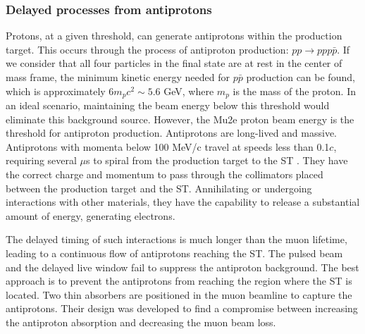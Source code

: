 \subsubsection{Delayed processes from antiprotons}
Protons, at a given threshold, can generate antiprotons 
within the production target. This occurs through the 
process of antiproton production: $pp \rightarrow ppp\bar{p}$. 
If we consider that all four particles in the final state are 
at rest in the center of mass frame, the minimum kinetic energy 
needed for $p\bar{p}$ production can be found, which is 
approximately $6 m_pc^2 \sim 5.6$ GeV, where $m_p$ is the 
mass of the proton. In an ideal scenario, maintaining the 
beam energy below this threshold would eliminate  
this background source.
However, the Mu2e 
proton beam energy is the threshold for antiproton production. 
Antiprotons are long-lived and massive. Antiprotons with 
momenta below 100 MeV/c travel at speeds less than 0.1$c$, 
requiring several $\mu$s to spiral from the production target 
to the ST \cite{bartoszek2015mu2e}. They have the correct 
charge and momentum to pass through the collimators placed 
between the production target and the ST. Annihilating or 
undergoing interactions with other materials, they have the 
capability to release a substantial amount of energy, generating 
electrons.


The delayed timing of 
such interactions is much longer than the muon lifetime, leading to a 
continuous flow of antiprotons reaching the ST. The pulsed beam and 
the delayed live window fail to suppress the antiproton background. 
The best approach is to prevent the antiprotons from reaching the 
region where the ST is located.
Two thin absorbers are positioned in 
the muon beamline to capture the antiprotons. Their design was 
developed to find a compromise between increasing the antiproton 
absorption and decreasing the muon beam loss. 

